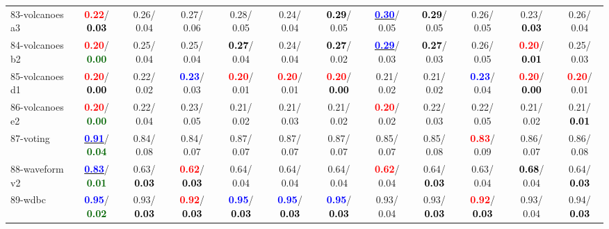 \begin{table}[h]
\begin{center}
{\begin{tabular}{lc|c|c|c|c|c|c|c|c|c|c}
83-volcanoes a3 & \textcolor{red}{\textbf{  0.22}}/\textcolor{black}{\textbf{  0.03}} &   0.26/  0.04 &   0.27/  0.06 &   0.28/  0.05 &   0.24/  0.04 & \textcolor{black}{\textbf{  0.29}}/  0.05 & \underline{\textcolor{blue}{\textbf{  0.30}}}/  0.05 & \textcolor{black}{\textbf{  0.29}}/  0.05 &   0.26/  0.05 &   0.23/\textcolor{black}{\textbf{  0.03}} &   0.26/  0.04 \\
84-volcanoes b2 & \textcolor{red}{\textbf{  0.20}}/\textcolor{darkgreen}{\textbf{  0.00}} &   0.25/  0.04 &   0.25/  0.04 & \textcolor{black}{\textbf{  0.27}}/  0.04 &   0.24/  0.04 & \textcolor{black}{\textbf{  0.27}}/  0.02 & \underline{\textcolor{blue}{\textbf{  0.29}}}/  0.03 & \textcolor{black}{\textbf{  0.27}}/  0.03 &   0.26/  0.05 & \textcolor{red}{\textbf{  0.20}}/\textcolor{black}{\textbf{  0.01}} &   0.25/  0.03 \\
85-volcanoes d1 & \textcolor{red}{\textbf{  0.20}}/\textcolor{black}{\textbf{  0.00}} &   0.22/  0.02 & \textcolor{blue}{\textbf{  0.23}}/  0.03 & \textcolor{red}{\textbf{  0.20}}/  0.01 & \textcolor{red}{\textbf{  0.20}}/  0.01 & \textcolor{red}{\textbf{  0.20}}/\textcolor{black}{\textbf{  0.00}} &   0.21/  0.02 &   0.21/  0.02 & \textcolor{blue}{\textbf{  0.23}}/  0.04 & \textcolor{red}{\textbf{  0.20}}/\textcolor{black}{\textbf{  0.00}} & \textcolor{red}{\textbf{  0.20}}/  0.01 \\ \hline
86-volcanoes e2 & \textcolor{red}{\textbf{  0.20}}/\textcolor{darkgreen}{\textbf{  0.00}} &   0.22/  0.04 &   0.23/  0.05 &   0.21/  0.02 &   0.21/  0.03 &   0.21/  0.02 & \textcolor{red}{\textbf{  0.20}}/  0.02 &   0.22/  0.03 &   0.22/  0.05 &   0.21/  0.02 &   0.21/\textcolor{black}{\textbf{  0.01}} \\
87-voting & \underline{\textcolor{blue}{\textbf{  0.91}}}/\textcolor{darkgreen}{\textbf{  0.04}} &   0.84/  0.08 &   0.84/  0.07 &   0.87/  0.07 &   0.87/  0.07 &   0.87/  0.07 &   0.85/  0.07 &   0.85/  0.08 & \textcolor{red}{\textbf{  0.83}}/  0.09 &   0.86/  0.07 &   0.86/  0.08 \\
88-waveform v2 & \underline{\textcolor{blue}{\textbf{  0.83}}}/\textcolor{darkgreen}{\textbf{  0.01}} &   0.63/\textcolor{black}{\textbf{  0.03}} & \textcolor{red}{\textbf{  0.62}}/\textcolor{black}{\textbf{  0.03}} &   0.64/  0.04 &   0.64/  0.04 &   0.64/  0.04 & \textcolor{red}{\textbf{  0.62}}/  0.04 &   0.64/\textcolor{black}{\textbf{  0.03}} &   0.63/  0.04 & \textcolor{black}{\textbf{  0.68}}/  0.04 &   0.64/\textcolor{black}{\textbf{  0.03}} \\
89-wdbc & \textcolor{blue}{\textbf{  0.95}}/\textcolor{darkgreen}{\textbf{  0.02}} &   0.93/\textcolor{black}{\textbf{  0.03}} & \textcolor{red}{\textbf{  0.92}}/\textcolor{black}{\textbf{  0.03}} & \textcolor{blue}{\textbf{  0.95}}/\textcolor{black}{\textbf{  0.03}} & \textcolor{blue}{\textbf{  0.95}}/\textcolor{black}{\textbf{  0.03}} & \textcolor{blue}{\textbf{  0.95}}/\textcolor{black}{\textbf{  0.03}} &   0.93/  0.04 &   0.93/\textcolor{black}{\textbf{  0.03}} & \textcolor{red}{\textbf{  0.92}}/\textcolor{black}{\textbf{  0.03}} &   0.93/  0.04 &   0.94/\textcolor{black}{\textbf{  0.03}} \\

\end{tabular}}
\end{center}
\end{table}
